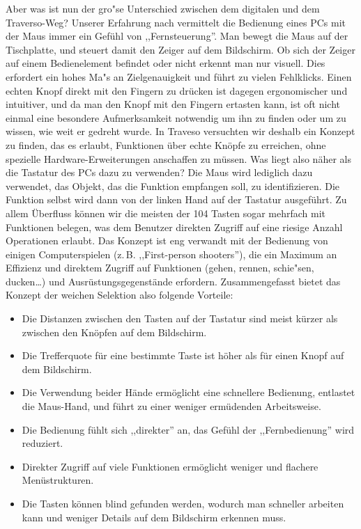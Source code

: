 Aber was ist nun der gro"se Unterschied zwischen dem digitalen und dem Traverso-Weg? Unserer Erfahrung nach vermittelt die Bedienung eines PCs mit der Maus immer ein Gefühl von ,,Fernsteuerung''. Man bewegt die Maus auf der Tischplatte, und steuert damit den Zeiger auf dem Bildschirm. Ob sich der Zeiger auf einem Bedienelement befindet oder nicht erkennt man nur visuell. Dies erfordert ein hohes Ma"s an Zielgenauigkeit und führt zu vielen Fehlklicks. Einen echten Knopf direkt mit den Fingern zu drücken ist dagegen ergonomischer und intuitiver, und da man den Knopf mit den Fingern ertasten kann, ist oft nicht einmal eine besondere Aufmerksamkeit notwendig um ihn zu finden oder um zu wissen, wie weit er gedreht wurde. In Traveso versuchten wir deshalb ein Konzept zu finden, das es erlaubt, Funktionen über echte Knöpfe zu erreichen, ohne spezielle Hardware-Erweiterungen anschaffen zu müssen. Was liegt also näher als die Tastatur des PCs dazu zu verwenden? Die Maus wird lediglich dazu verwendet, das Objekt, das die Funktion empfangen soll, zu identifizieren. Die Funktion selbst wird dann von der linken Hand auf der Tastatur ausgeführt. Zu allem Überfluss können wir die meisten der 104 Tasten sogar mehrfach mit Funktionen belegen, was dem Benutzer direkten Zugriff auf eine riesige Anzahl Operationen erlaubt. Das Konzept ist eng verwandt mit der Bedienung von einigen Computerspielen (z.\,B. ,,First-person shooters''), die ein Maximum an Effizienz und direktem Zugriff auf Funktionen (gehen, rennen, schie"sen, ducken\dots) und Ausrüstungsgegenstände erfordern. Zusammengefasst bietet das Konzept der weichen Selektion also folgende Vorteile:

\begin{itemize}
 \item Die Distanzen zwischen den Tasten auf der Tastatur sind meist kürzer als zwischen den Knöpfen auf dem Bildschirm.
 \item Die Trefferquote für eine bestimmte Taste ist höher als für einen Knopf auf dem Bildschirm.
 \item Die Verwendung beider Hände ermöglicht eine schnellere Bedienung, entlastet die Maus-Hand, und führt zu einer weniger ermüdenden Arbeitsweise.
 \item Die Bedienung fühlt sich ,,direkter'' an, das Gefühl der ,,Fernbedienung'' wird reduziert.
 \item Direkter Zugriff auf viele Funktionen ermöglicht weniger und flachere Menüstrukturen.
 \item Die Tasten können blind gefunden werden, wodurch man schneller arbeiten kann und weniger Details auf dem Bildschirm erkennen muss.
\end{itemize}

